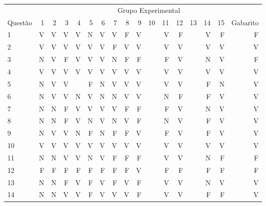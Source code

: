 \begin{apendicesenv}
\begin{center}
\begin{tabular}{ l r r r r r r r r r r r r r r r r r r r}
	\hline
	\bottomrule
	\end{tabular}
\end{center}

\begin{center}
	\begin{tabular}{ l r r r r r r r r r r r r r r r r}
	\hline
	& \multicolumn{16}{c}{Grupo Experimental}\\
	\cline{2 - 16} %
	\multirow[c]{-2}{*}{Questão} & \textcolor[rgb]{0.9,0,0}{1} & \textcolor[rgb]{0.9,0,0}{2} & \textcolor[rgb]{0,0,0.9}{3} & \textcolor[rgb]{0,0,0.9}{4} & \textcolor[rgb]{0.9,0,0}{5} & \textcolor[rgb]{0.9,0,0}{6} & \textcolor[rgb]{0,0,0.9}{7} & \textcolor[rgb]{0,0,0.9}{8} & \textcolor[rgb]{0,0,0.9}{9} & \textcolor[rgb]{0.9,0,0}{10} & \textcolor[rgb]{0,0,0.9}{11} & \textcolor[rgb]{0.9,0,0}{12} & \textcolor[rgb]{0,0,0.9}{13} & \textcolor[rgb]{0,0,0.9}{14} & \textcolor[rgb]{0.9,0,0}{15}  & Gabarito\\
	\hline
	1	&	V	&	V	&	V	&	V	&	N	&	V	&	V	&	F	&	V	&       &	V	&	F	&       &	V	&	F	&	F	\\
	2	&	V	&	V	&	V	&	V	&	V	&	V	&	F	&	V	&	V	&       &	V	&	V	&       &	V	&	V	&	V	\\
	3	&	N	&	V	&	F	&	V	&	V	&	V	&	N	&	F	&	F	&       &	F	&	V	&       &	N	&	V	&	F	\\
	4	&	V	&	V	&	V	&	V	&	V	&	V	&	V	&	V	&	V	&       &	V	&	V	&       &	V	&	V	&	V	\\
	5	&	N	&	V	&	V	&		&	F	&	N	&	V	&	V	&	V	&       &	V	&	V	&       &	F	&	N	&	V	\\
	6	&	N	&	V	&	V	&	N	&	V	&	N	&	N	&	V	&	V	&       &	N	&	F	&       &	F	&	V	&	V	\\
	7	&	N	&	N	&	F	&	V	&	V	&	V	&	V	&	F	&	F	&       &	F	&	V	&       &	N	&	V	&	V	\\
	8	&	N	&	N	&	F	&	V	&	N	&	V	&	N	&	V	&	F	&       &	N	&	V	&       &	F	&	V	&	V	\\
	9	&	N	&	V	&	V	&	N	&	F	&	N	&	F	&	F	&	V	&       &	F	&	V	&       &	F	&	V	&	V	\\
	10	&	V	&	V	&	V	&	V	&	V	&	V	&	V	&	V	&	V	&       &	V	&	V	&       &	V	&	V	&	V	\\
	11	&	N	&	N	&	V	&	V	&	N	&	V	&	F	&	F	&	F	&       &	V	&	V	&       &	N	&	F	&	F	\\
	12	&	F	&	F	&	F	&	F	&	F	&	F	&	F	&	F	&	V	&       &	F	&	F	&       &	F	&	F	&	F	\\
	13	&	N	&	N	&	F	&	V	&	F	&	V	&	F	&	V	&	F	&       &	V	&	V	&       &	N	&	V	&	V	\\
	14	&	N	&	N	&	V	&	V	&	F	&	V	&	V	&	V	&	F	&       &	V	&	V	&       &	F	&	F	&	V	\\

\end{tabular}
\end{center}
\end{apendicesenv}

